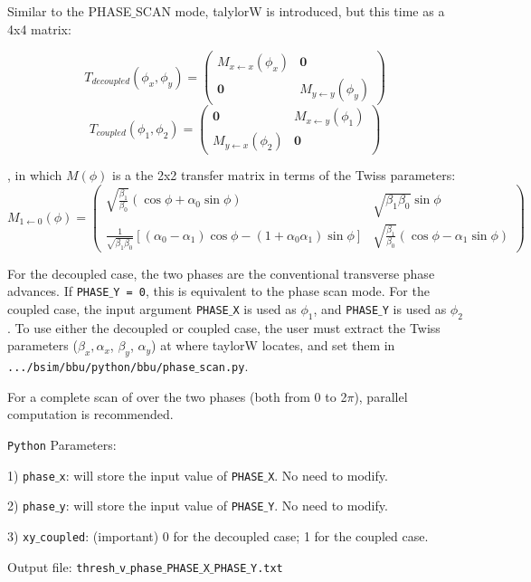 \documentclass{article}
\begin{document}
\bigbreak
Similar to the PHASE$\_$SCAN mode, talylorW is introduced, but this time as a 4x4 matrix:

  

\[
T_{decoupled}(\phi_{x},\phi_{y}) =
\begin{pmatrix}
   M_{x\leftarrow x} (\phi_{x}) & \boldsymbol{0}    \\
  \boldsymbol{0}  &  M_{y\leftarrow y} (\phi_{y}) 
\end{pmatrix}
\]
\[
T_{coupled}(\phi_{1},\phi_{2}) =
\begin{pmatrix}
  \boldsymbol{0}   & M_{x\leftarrow y} (\phi_{1})   \\
   M_{y\leftarrow x} (\phi_{2})   & \boldsymbol{0}
\end{pmatrix}
\]

, in which $M(\phi)$ is a the 2x2 transfer matrix in terms of the Twiss parameters:
\[
M_{1 \leftarrow 0}(\phi) =
\begin{pmatrix}
  \sqrt{\frac{\beta_{1}}{\beta_{0}}} (\cos\phi+\alpha_{0}\sin\phi) & \sqrt{\beta_{1} \beta_{0}}\sin\phi \\ 
  \frac{1}{\sqrt{\beta_{1}\beta_{0}}}[(\alpha_{0}-\alpha_{1})\cos\phi-(1+\alpha_{0}\alpha_{1})\sin\phi] & \sqrt{\frac{\beta_{1}}{\beta_{0}}} (\cos\phi-\alpha_{1}\sin\phi) 
\end{pmatrix}
\]

For the decoupled case, the two phases are the conventional transverse phase advances. If \texttt{PHASE$\_$Y = 0}, this is equivalent to the phase scan mode. For the coupled case, the input argument \texttt{PHASE$\_$X} is used as $\phi_1$, and \texttt{PHASE$\_$Y} is used as $\phi_2$.
To use either the decoupled or coupled case, the user must extract the Twiss parameters ($\beta_x, \alpha_x$, $\beta_y$, $\alpha_y$) at where taylorW locates, and set them in \texttt{.../bsim/bbu/python/bbu/phase$\_$scan.py}.

For a complete scan of over the two phases (both from 0 to 2$\pi$), parallel computation is recommended. 

\bigbreak
\texttt{Python} Parameters:

1) \texttt{phase$\_$x}: will store the input value of \texttt{PHASE$\_$X}. No need to modify.

2) \texttt{phase$\_$y}: will store the input value of \texttt{PHASE$\_$Y}. No need to modify.

3) \texttt{xy$\_$coupled}: (important) 0 for the decoupled case; 1 for the coupled case. 


\bigbreak     
Output file: \texttt{thresh$\_$v$\_$phase$\_$PHASE$\_$X$\_$PHASE$\_$Y.txt} 
\end{document}
